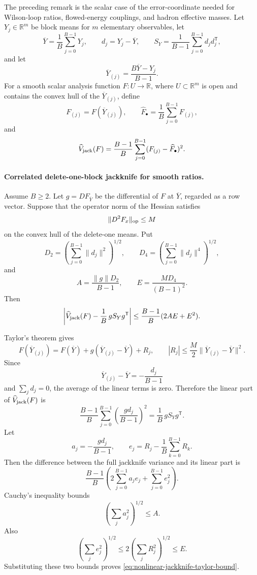 The preceding remark is the scalar case of the error-coordinate needed
for Wilson-loop ratios, flowed-energy couplings, and hadron effective masses.
Let \(Y_j\in\mathbb R^m\) be block means for \(m\) elementary observables,
let
\begin{equation}
  \overline Y=\frac1B\sum_{j=0}^{B-1}Y_j,
  \qquad
  d_j=Y_j-\overline Y,
  \qquad
  S_Y=\frac{1}{B-1}\sum_{j=0}^{B-1}d_jd_j^{\mathsf T},
  \label{eq:block-vector-covariance}
\end{equation}
and let
\begin{equation}
  \overline Y_{(j)}
  =
  \frac{B\overline Y-Y_j}{B-1}.
  \label{eq:vector-delete-one-block-mean}
\end{equation}
For a smooth scalar analysis function \(F:U\to\mathbb R\), where
\(U\subset\mathbb R^m\) is open and contains the convex hull of the
\(\overline Y_{(j)}\), define
\[
  F_{(j)}=F(\overline Y_{(j)}),
  \qquad
  \widehat F_\bullet=\frac1B\sum_{j=0}^{B-1}F_{(j)},
\]
and
\begin{equation}
  \widehat V_{\rm jack}(F)
  =
  \frac{B-1}{B}\sum_{j=0}^{B-1}(F_{(j)}-\widehat F_\bullet)^2 .
  \label{eq:nonlinear-block-jackknife-variance}
\end{equation}

\paragraph{Correlated delete-one-block jackknife for smooth ratios.}
Assume \(B\ge2\).  Let \(g=DF_{\overline Y}\) be the differential of \(F\) at
\(\overline Y\), regarded as a row vector.  Suppose that the operator norm of
the Hessian satisfies
\[
  \|D^2F_x\|_{\rm op}\le M
\]
on the convex hull of the delete-one means.  Put
\[
  D_2=\left(\sum_{j=0}^{B-1}\|d_j\|^2\right)^{1/2},
  \qquad
  D_4=\left(\sum_{j=0}^{B-1}\|d_j\|^4\right)^{1/2},
\]
and
\[
  A=\frac{\|g\|D_2}{B-1},
  \qquad
  E=\frac{M D_4}{(B-1)^2}.
\]
Then
\begin{equation}
  \left|
    \widehat V_{\rm jack}(F)
    -
    \frac1B\,gS_Yg^{\mathsf T}
  \right|
  \le
  \frac{B-1}{B}(2AE+E^2).
  \label{eq:nonlinear-jackknife-taylor-bound}
\end{equation}

Taylor's theorem gives
\[
  F(\overline Y_{(j)})
  =
  F(\overline Y)+g(\overline Y_{(j)}-\overline Y)+R_j,
  \qquad
  |R_j|\le\frac{M}{2}\|\overline Y_{(j)}-\overline Y\|^2 .
\]
Since
\[
  \overline Y_{(j)}-\overline Y=-\frac{d_j}{B-1}
\]
and \(\sum_j d_j=0\), the average of the linear terms is zero.  Therefore the
linear part of \(\widehat V_{\rm jack}(F)\) is
\[
  \frac{B-1}{B}
  \sum_{j=0}^{B-1}
  \left(\frac{gd_j}{B-1}\right)^2
  =
  \frac1B\,gS_Yg^{\mathsf T}.
\]
Let
\[
  a_j=-\frac{gd_j}{B-1},
  \qquad
  e_j=R_j-\frac1B\sum_{k=0}^{B-1}R_k .
\]
Then the difference between the full jackknife variance and its linear part is
\[
  \frac{B-1}{B}
  \left(
    2\sum_{j=0}^{B-1}a_je_j+\sum_{j=0}^{B-1}e_j^2
  \right).
\]
Cauchy's inequality bounds
\[
  \left(\sum_j a_j^2\right)^{1/2}\le A.
\]
Also
\[
  \left(\sum_j e_j^2\right)^{1/2}
  \le
  2\left(\sum_j R_j^2\right)^{1/2}
  \le E .
\]
Substituting these two bounds proves
\eqref{eq:nonlinear-jackknife-taylor-bound}.

